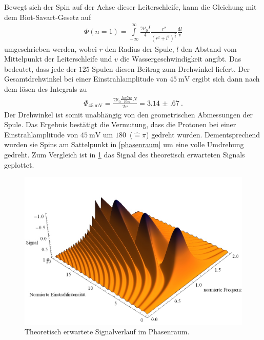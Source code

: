 \documentclass[paper=a4,
	fontsize=10pt,
	DIV=18,
	twocolumn,
	parskip=half
	]{scrartcl}
\numberwithin{equation}{section}    %
\begin{document}
Bewegt sich der Spin auf der Achse dieser Leiterschleife, kann die Gleichung mit dem Biot-Savart-Gesetz auf
\begin{align}
	\Phi(n=1)= \overset{\infty}{\underset{-\infty}{\int}}  \frac{\gamma \mu_0 I}{4}  \frac{r^2}{(r^2+l^2)^{\frac{3}{2}}} \frac{\mathrm{d}l}{v}
\end{align}
umgeschrieben werden, wobei $r$ den Radius der Spule, $l$ den Abstand vom Mittelpunkt der Leiterschleife und $v$ die Wassergeschwindigkeit angibt.
Das bedeutet, dass jede der $125$ Spulen diesen Beitrag zum Drehwinkel liefert.
Der Gesamtdrehwinkel bei einer Einstrahlamplitude von $\SI{45}{\milli\volt}$ ergibt sich dann nach dem lösen des Integrals zu
\begin{align}
	\Phi_{\SI{45}{\milli\volt}}=  \frac{\gamma \mu_0  \frac{f_{ES} U_{\mathrm{ES}}}{R_{\mathrm{ES}}} N}{2 v} = \SI{3.14(67)}{}.
\end{align}
Der Drehwinkel ist somit unabhängig von den geometrischen Abmessungen der Spule.
Das Ergebnis bestätigt die Vermutung, dass die Protonen bei einer Einstrahlamplitude von $\SI{45}{\milli\volt}$ um $180$\textdegree\ ($\widehat{=} \pi$) gedreht wurden.
Dementsprechend wurden sie Spins am Sattelpunkt in \cref{phasenraum} um eine volle Umdrehung gedreht.
Zum Vergleich ist in \cref{phasenraumTh} das Signal des theoretisch erwarteten Signals geplottet. 

\begin{figure}[htp]
	\begin{center}
		\includegraphics[width=\columnwidth]{Bilder/TheoriePR.jpg}
		\caption{Theoretisch erwartete Signalverlauf im Phasenraum.}
		\label{phasenraumTh}
	\end{center}
\end{figure}
\end{document}
